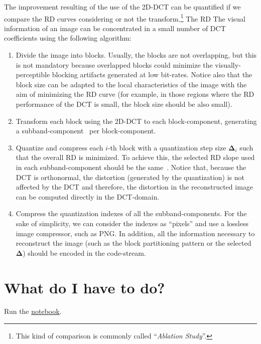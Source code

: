 The improvement resulting of the use of the 2D-DCT can be
quantified if we compare the RD curves considering or not the
transform.\footnote{This kind of comparison is commonly called
``\emph{Ablation Study}''.} The RD The visual information of an image can be
concentrated in a small number of DCT coefficients using the following
algorithm:
\begin{enumerate}
\item Divide the image into blocks. Usually, the blocks are not
  overlapping, but this is not mandatory because overlapped blocks
  could minimize the visually-perceptible blocking artifacts generated
  at low bit-rates. Notice also that the block size can be adapted to
  the local characteristics of the image with the aim of minimizing
  the RD curve (for example, in those regions where the RD performance
  of the DCT is small, the block size should be also small).
\item Transform each block using the 2D-DCT to each block-component,
  generating a subband-component~\cite{vruiz__transform_coding} per
  block-component.
\item Quantize and compress each $i$-th block with a quantization step
  size ${\mathbf\Delta}_i$ such that the overall RD is minimized. To
  achieve this, the selected RD slope used in each subband-component
  should be the same~\cite{vetterli2014foundations}. Notice that,
  because the DCT is orthonormal, the distortion (generated by the
  quantization) is not affected by the DCT and therefore, the
  distortion in the reconstructed image can be computed directly in
  the DCT-domain.
\item Compress the quantization indexes of all the
  subband-components. For the sake of simplicity, we can consider the
  indexes as ``pixels'' and use a lossless image compressor, such as
  PNG. In addition, all the information necessary to reconstruct the image
  (such as the block partitioning pattern or the selected
  ${\mathbf\Delta}$) should be encoded in the code-stream.
\end{enumerate}

\section{What do I have to do?}
Run the \href{https://github.com/Sistemas-s-Multimedia.github.io/blob/master/contents/2D_DCT/RD_performance.ipynb}{notebook}.


